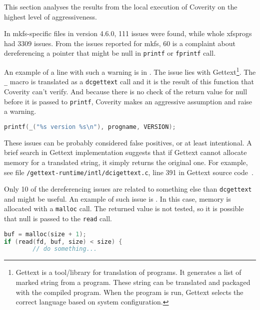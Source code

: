 This section analyses the results from the local execution of Coverity on the
highest level of aggressiveness.

In mkfs-specific files in version 4.6.0, 111 issues were found, while whole xfsprogs
had 3309 issues. From the issues reported for mkfs, 60 is a complaint about
dereferencing a pointer that might be null in {\tt printf} or {\tt fprintf}
call.

An example of a line with such a warning is in
. The issue lies with
Gettext\footnote{Gettext is a tool/library for translation of programs. It
generates a list of marked string from a program. These string can be
translated and packaged with the compiled program. When the program is run,
Gettext selects the correct language based on system configuration.}. The {\tt
\_}
macro is translated as a {\tt dcgettext} call and it is the result of this
function that Coverity can't verify. And because there is no check of the
return value for null before it is passed to {\tt printf}, Coverity makes an
aggressive assumption and raise a warning.

\begin{lstlisting}[frame=none, basicstyle=\footnotesize\ttfamily,
language=C, numbers=none, numberstyle=\tiny\color{black},caption=
{{\tt xfs\_mkfs.c:1713}: Line which is reportedly dereferencing a potentially
null pointer with Gettext},
label={lst:results:dereferencePrintf}]
printf(_("%s version %s\n"), progname, VERSION);
\end{lstlisting}

These issues can be probably considered false positives, or at least
intentional. A brief search in Gettext implementation suggests that if Gettext
cannot allocate memory for a translated string, it simply returns the original
one. For example, see file {\tt /gettext-runtime/intl/dcigettext.c}, line 391
in Gettext source code~\cite{GettextGit}.

Only 10 of the dereferencing issues are related to something else
than {\tt dcgettext} and might be useful. An example of such issue is
.  In this case, memory is allocated with a
{\tt malloc} call. The returned value is not tested, so it is possible that
null is passed to the {\tt read} call.

\begin{lstlisting}[frame=none, basicstyle=\footnotesize\ttfamily,
language=C, numbers=none, numberstyle=\tiny\color{black},caption=
{{\tt proto.c:66}: Line which is reportedly dereferencing a potentially null
pointer - no malloc check.},
label={lst:results:dereferenceBuf}]
buf = malloc(size + 1);
if (read(fd, buf, size) < size) {
        // do something...
\end{lstlisting}

